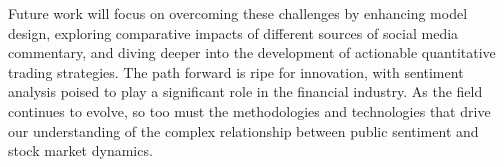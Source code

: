\documentclass[11pt,a4paper]{article}
\begin{document}
  Future work will focus on overcoming these challenges by enhancing model design, exploring comparative impacts of different sources of social media commentary, and diving deeper into the development of actionable quantitative trading strategies. The path forward is ripe for innovation, with sentiment analysis poised to play a significant role in the financial industry. As the field continues to evolve, so too must the methodologies and technologies that drive our understanding of the complex relationship between public sentiment and stock market dynamics.



\end{document}
